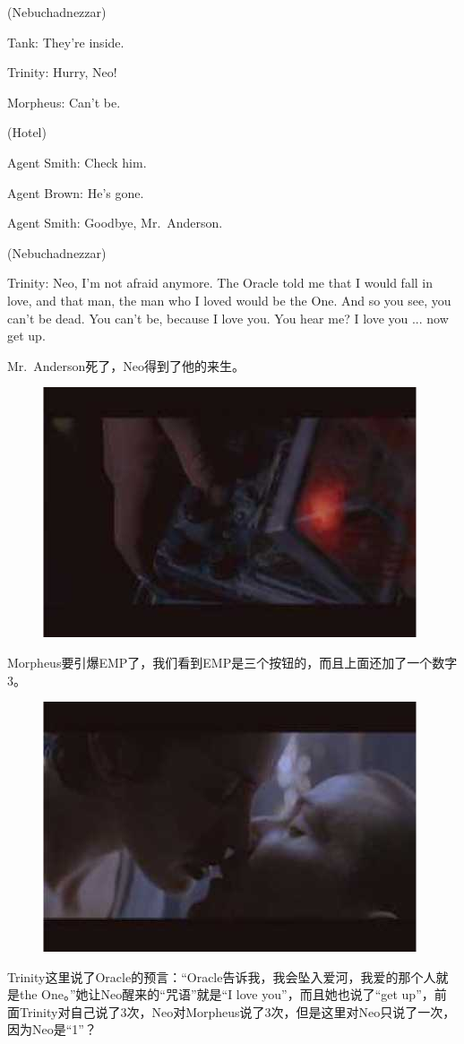 \documentclass[UTF8]{ctexart}
\newenvironment{myquote}{\color{green} \setlength{\leftskip}{6em} \setlength{\rightskip}{4em} \setlength{\parindent}{-2em}}{\par}
\begin{document}
\begin{myquote}
(Nebuchadnezzar)

Tank: They're inside.

Trinity: Hurry, Neo!

Morpheus: Can't be.

(Hotel)

Agent Smith: Check him.

Agent Brown: He's gone.

Agent Smith: Goodbye, Mr.~Anderson.

(Nebuchadnezzar)

Trinity: Neo, I'm not afraid anymore. The Oracle told me that I would fall in love, and that man, the man who I loved would be the One. And so you see, you can't be dead. You can't be, because I love you. You hear me? I love you ... now get up.
\end{myquote}

Mr.~Anderson死了，Neo得到了他的来生。

\begin{figure}[htb]
\centering
\includegraphics[width=0.5\linewidth]{fig/read_Matrix-88}
\end{figure}

Morpheus要引爆EMP了，我们看到EMP是三个按钮的，而且上面还加了一个数字3。

\begin{figure}[htb]
\centering
\includegraphics[width=0.5\linewidth]{fig/read_Matrix-89}
\end{figure}

Trinity这里说了Oracle的预言：“Oracle告诉我，我会坠入爱河，我爱的那个人就是the One。”她让Neo醒来的“咒语”就是“I love you”，而且她也说了“get up”，前面Trinity对自己说了3次，Neo对Morpheus说了3次，但是这里对Neo只说了一次，因为Neo是“1”？
\end{document}
